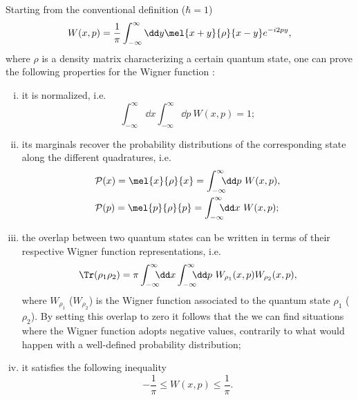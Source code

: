 Starting from the conventional definition ($\hbar = 1$)
\begin{equation}\label{Wigner:def}
    W(x,p) = \dfrac{1}{\pi} 
             \int^{\infty}_{-\infty} \dd y
             \mel{x + y}{\rho}{x-y}e^{-i2py},
\end{equation}
where $\rho$ is a density matrix characterizing a certain quantum state, one can prove the following properties for the Wigner function \cite{SchleichBook}:
\begin{enumerate}[(i)]
    \item it is normalized, i.e.
    \begin{equation}
        \int^{\infty}_{-\infty} \!\!\!\!\dd x
        \int^{\infty}_{-\infty} \!\!\!\!\dd p \ W(x,p) = 1;
    \end{equation}
    \item its marginals recover the probability distributions of the corresponding state along the different quadratures, i.e.
    \begin{equation}
        \begin{aligned}
        &\mathcal{P}(x) 
        = \mel{x}{\rho}{x} =\int^{\infty}_{-\infty} \!\!\!\!\dd p \ W(x,p),\\
        &\mathcal{P}(p)
        = \mel{p}{\rho}{p}
        = \int^{\infty}_{-\infty} \!\!\!\!\dd x \ W(x,p);
        \end{aligned}
    \end{equation}
    \item the overlap between two quantum states can be written in terms of their respective Wigner function representations, i.e.
    \begin{equation}
        \Tr(\rho_1 \rho_2)
            = \pi \int^{\infty}_{-\infty}\!\!\!\! \dd x
                  \int^{\infty}_{-\infty}\!\!\!\! \dd p
                        \ W_{\rho_1}(x,p)W_{\rho_2}(x,p),
    \end{equation}
    where $W_{\rho_1}$ ($W_{\rho_2}$) is the Wigner function associated to the quantum state $\rho_1$ ($\rho_2$). By setting this overlap to zero it follows that the we can find situations where the Wigner function adopts negative values, contrarily to what would happen with a well-defined probability distribution;
    \item it satisfies the following inequality
    \begin{equation}
        -\dfrac{1}{\pi} \leq W(x,p) \leq \dfrac{1}{\pi}. 
    \end{equation}
\end{enumerate}

